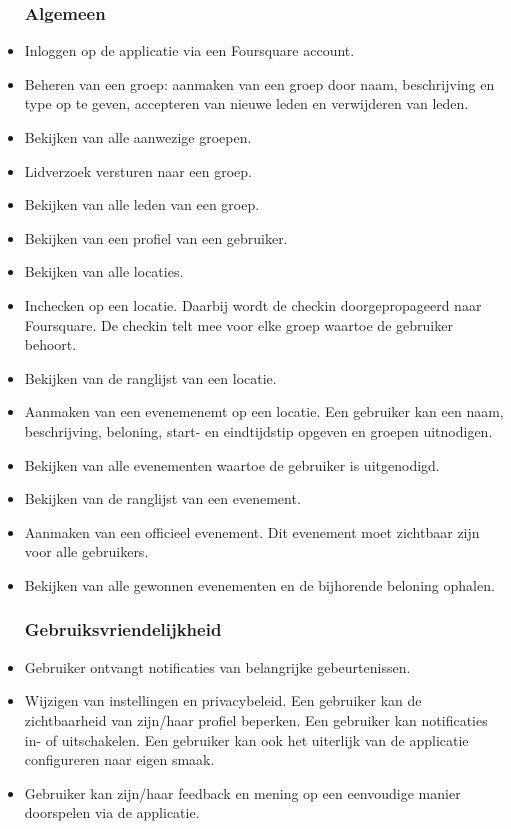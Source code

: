 \begin{itemize}
	
\subsubsection{Algemeen}
\item Inloggen op de applicatie via een Foursquare account.
\item Beheren van een groep: aanmaken van een groep door naam, beschrijving en type op te geven, accepteren van nieuwe leden en verwijderen van leden.   
\item Bekijken van alle aanwezige groepen.
\item Lidverzoek versturen naar een groep.
\item Bekijken van alle leden van een groep.
\item Bekijken van een profiel van een gebruiker.
\item Bekijken van alle locaties.
\item Inchecken op een locatie. Daarbij wordt de checkin doorgepropageerd naar Foursquare. De checkin telt mee voor elke groep waartoe de gebruiker behoort. 
\item Bekijken van de ranglijst van een locatie.
\item Aanmaken van een evenemenemt op een locatie. Een gebruiker kan een naam, beschrijving, beloning, start- en eindtijdstip opgeven en groepen uitnodigen.
\item Bekijken van alle evenementen waartoe de gebruiker is uitgenodigd.
\item Bekijken van de ranglijst van een evenement.
\item Aanmaken van een officieel evenement. Dit evenement moet zichtbaar zijn voor alle gebruikers.
\item Bekijken van alle gewonnen evenementen en de bijhorende beloning ophalen.

\subsubsection{Gebruiksvriendelijkheid}

\item Gebruiker ontvangt notificaties van belangrijke gebeurtenissen.
\item Wijzigen van instellingen en privacybeleid. Een gebruiker kan de zichtbaarheid van zijn/haar profiel beperken. Een gebruiker kan notificaties in- of uitschakelen. Een gebruiker kan ook het uiterlijk van de applicatie configureren naar eigen smaak.
\item Gebruiker kan zijn/haar feedback en mening op een eenvoudige manier doorspelen via de applicatie.

\end{itemize}
